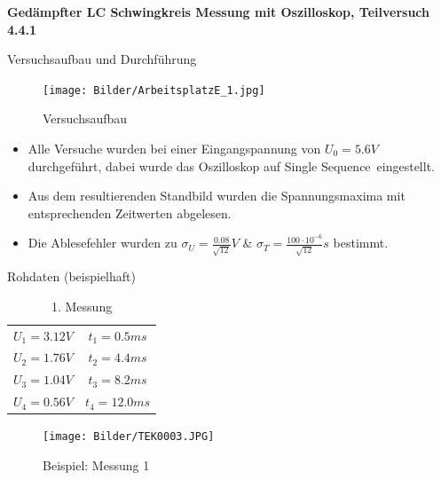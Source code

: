 \documentclass[11pt]{beamer}
\author{Gruppe C14}
\begin{document}
\begin{frame}
\titlepage
\end{frame}


\begin{frame}
\textbf{Gedämpfter LC Schwingkreis Messung mit Oszilloskop, Teilversuch 4.4.1}\centering
\end{frame}

\begin{frame}{Versuchsaufbau und Durchführung}
\begin{figure}[H]
\centering
\texttt{[image: Bilder/ArbeitsplatzE\_1.jpg]}
\caption{Versuchsaufbau}
\end{figure}
\end{frame}

\begin{frame}
\begin{itemize}
\item Alle Versuche wurden bei einer Eingangspannung von $U_0=5.6V$ durchgeführt, dabei wurde das Oszilloskop auf \glqq Single Sequence\grqq $\,$ eingestellt.
\item Aus dem resultierenden Standbild wurden die Spannungsmaxima mit entsprechenden Zeitwerten abgelesen.
\item Die Ablesefehler wurden zu $\sigma_U=\frac{0.08}{\sqrt{12}}V$ \& $\sigma_T=\frac{100\cdot 10^{-6}}{\sqrt{12}}s$ bestimmt.
\end{itemize}
\end{frame}

\begin{frame}{Rohdaten (beispielhaft)}
\begin{table}[H]\centering
\caption{1. Messung}
\begin{tabular}{c|c}
\hline
$U_1=3.12V$& $t_1=0.5ms$\\ 
$U_2=1.76V$& $t_2=4.4ms$\\ 
$U_3=1.04V$& $t_3=8.2ms$ \\
$U_4=0.56V$& $t_4=12.0ms$ \\
\end{tabular} 
\end{table}
\begin{figure}[H]\centering
\texttt{[image: Bilder/TEK0003.JPG]}
\caption{Beispiel: Messung 1}
\end{figure}
\end{frame}
\end{document}
